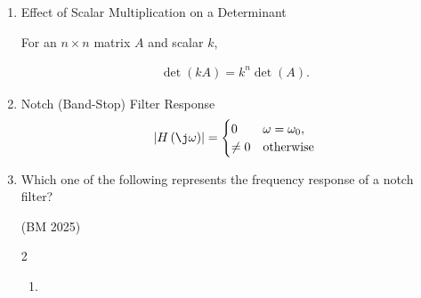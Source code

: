 \begin{enumerate}[label=\thesubsection.\arabic*,ref=\thesubsection.\theenumi]
\begin{align}
Z_n=\frac{\bar{X}_n-\mu}{\sigma/\sqrt{n}}
\;\xrightarrow{d}\;
\mathcal{N}(0,1).
\end{align}

Equivalently, for large $n$,

\begin{align}
\bar{X}_n\ \approx\ \mathcal{N}\!\left(\mu,\ \frac{\sigma^{2}}{n}\right),
\qquad
\sum_{i=1}^{n}X_i\ \approx\ \mathcal{N}\!\left(n\mu,\ n\sigma^{2}\right).
\end{align}


\item Effect of Scalar Multiplication on a Determinant

For an $n\times n$ matrix $A$ and scalar $k$,

\begin{align}
\det(kA)=k^{n}\det(A). \label{det}
\end{align}
\item Notch (Band-Stop) Filter Response
\begin{align}
	\abs{H\brak{\j \omega}} = 
	\begin{cases}
0 & \omega = \omega_0, \\
\ne 0 & \text{otherwise} 
\end{cases}
\label{eq:EE26BTECH11221-notch}
\end{align}
\item Which one of the following represents the frequency
response of a notch filter?

\hfill  (BM 2025)
\begin{multicols}{2}
\begin{enumerate}
\setlength{\itemsep}{0pt}

\item
\begin{center}
\end{center}
\end{enumerate}
\end{multicols}
\end{enumerate}
